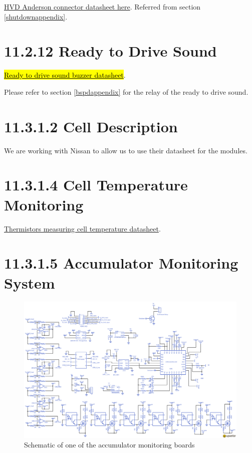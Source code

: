 \documentclass{article}
\DeclareRobustCommand{\hlr}[1]{{\sethlcolor{red}\hl{#1}}}
\begin{document}
\href{http://www.andersonpower.com/_global-assets/downloads/pdf/ds-smart.pdf}{HVD Anderson connector datasheet here}. Referred from section \ref{shutdownappendix}.

\section*{11.2.12 Ready to Drive Sound} \label{r2dappendix}

\href{http://www.mouser.com/ds/2/252/SC648ANR-63353.pdf}{\hlr{Ready to drive sound buzzer datasheet}}.

Please refer to section \ref{bspdappendix} for the relay of the ready to drive sound.

\section*{11.3.1.2 Cell Description}
We are working with Nissan to allow us to use their datasheet for the modules.

\section*{11.3.1.4 Cell Temperature Monitoring}

\href{http://media.digikey.com/PDF/Data\%20Sheets/Ametherm\%20PDFs/PANR\%20103395-408.pdf}{Thermistors measuring cell temperature datasheet}.

\section*{11.3.1.5 Accumulator Monitoring System}  \label{amsappendix}

\begin{figure}
    \centering
    \includegraphics[width = 1 \textwidth]{BMS_Schem}
    \caption{Schematic of one of the accumulator monitoring boards}
    \label{amsschem}
\end{figure}
\end{document}
